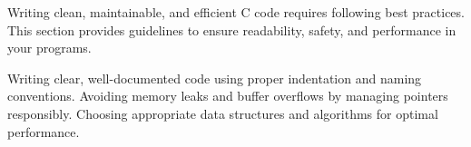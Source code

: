 \begin{comment}
10.5.1.1 Using <threads.h> for Threading Safety

10.5.1.2 Avoiding Data Races with _Atomic

10.5.2 Using Compiler Features for Better Safety

10.5.2.1 Static Analysis and Code Linting

10.5.2.2 Bounds Checking for Safer Memory Usage

10.6 C17 and Beyond – Future Best Practices
10.6.1 Writing High-Performance and Maintainable Code

10.6.1.1 Compiler Optimization Flags (-O3, -march=native)

10.6.1.2 Using #pragma for Code Tuning

10.6.2 The Future of C Code Style

10.6.2.1 Influence of Rust on Safer Code Practices

10.6.2.2 AI-Based Code Formatting and Optimization
\end{comment}

\begin{NxSBox}
	\begin{NxIDBox}
		Writing clean, maintainable, and efficient C code requires following best practices. This section provides guidelines to ensure readability, safety, and performance in your programs.
	\end{NxIDBox}
	\begin{NxIDBoxL}
		 Writing clear, well-documented code using proper indentation and naming conventions.
		 Avoiding memory leaks and buffer overflows by managing pointers responsibly.
		 Choosing appropriate data structures and algorithms for optimal performance.
	\end{NxIDBoxL}
\end{NxSBox}

